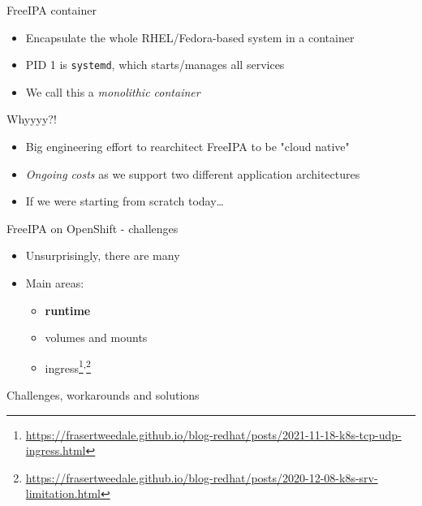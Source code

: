\documentclass[ignorenonframetext,aspectratio=169,12pt]{beamer}
\begin{document}
\begin{frame}{FreeIPA container}
\protect\hypertarget{freeipa-container}{}
\begin{itemize}
\item Encapsulate the whole RHEL/Fedora-based system in a container
\item PID 1 is {\tt systemd}, which starts/manages all services
\item We call this a {\em monolithic container}
\end{itemize}
\end{frame}


\begin{frame}{Whyyyy?!}
\protect\hypertarget{freeipa-monolith-why}{}
\begin{itemize}
\item Big engineering effort to rearchitect FreeIPA to be "cloud native"
\item {\em Ongoing costs} as we support two
    different application architectures
\item If we were starting from scratch today\ldots{}
\end{itemize}
\end{frame}


\begin{frame}{FreeIPA on OpenShift - challenges}
\protect\hypertarget{freeipa-openshift-challenges}{}
\begin{itemize}
\item Unsurprisingly, there are many
\item Main areas:
    \begin{itemize}
    \item {\bf runtime}
    \item volumes and mounts
    \item
    ingress\footnote{\url{https://frasertweedale.github.io/blog-redhat/posts/2021-11-18-k8s-tcp-udp-ingress.html}}\textsuperscript{,}\footnote{\url{https://frasertweedale.github.io/blog-redhat/posts/2020-12-08-k8s-srv-limitation.html}}
    \end{itemize}
\end{itemize}
\end{frame}


\begin{frame}[plain]
\centering
\huge Challenges, workarounds and solutions
\end{frame}
\end{document}
